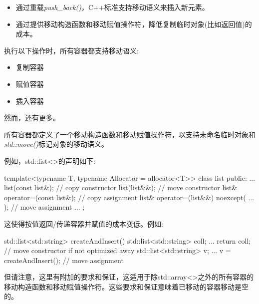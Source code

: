 \begin{itemize}
  \item 通过重载\textit{push\_\allowbreak{}back(\allowbreak{})\allowbreak{}}，C++标准支持移动语义来插入新元素。
  \item 通过提供移动构造函数和移动赋值操作符，降低复制临时对象(比如返回值)的成本。
\end{itemize}

执行以下操作时，所有容器都支持移动语义:\par

\begin{itemize}
  \item 复制容器
  \item 赋值容器
  \item 插入容器
\end{itemize}

然而，还有更多。\par


所有容器都定义了一个移动构造函数和移动赋值操作符，以支持未命名临时对象和\textit{std::move()}标记对象的移动语义。\par

例如，std::list<>的声明如下:\par

\begin{codebox}[cpp]
template<typename T, typename Allocator = allocator<T>>
class list {
  public:
  ...
  list(const list&); // copy constructor
  list(list&&); // move constructor
  list& operator=(const list&); // copy assignment
  list& operator=(list&&) noexcept( ... ); // move assignment
  ...
};
\end{codebox}

这使得按值返回/传递容器并赋值的成本变低。例如:\par

\begin{codebox}[cpp]
std::list<std::string> createAndInsert()
{
  std::list<std::string> coll;
  ...
  return coll; // move constructor if not optimized away
}
std::list<std::string> v;
...
v = createAndInsert(); // move assignment
\end{codebox}

但请注意，这里有附加的要求和保证，这适用于除std::array<>之外的所有容器的移动构造函数和移动赋值操作符。这些要求和保证意味着已移动的容器移动是空的。\par


